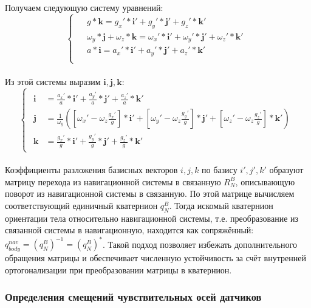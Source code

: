 Получаем следующую систему уравнений:
\[
\begin{cases}
	\begin{aligned}
		&g * \bm{k} = g_{x}' * \bm{i}' + g_{y}' * \bm{j}' + g_{z}' * \bm{k}' \\
		&\omega_{y} * \bm{j} + \omega_{z} * \bm{k} = \omega_{x}' * \bm{i}' + \omega_{y}' * \bm{j}' + \omega_{z}' * \bm{k}' \\
		&a * \bm{i} = a_{x}' * \bm{i}' + a_{y}' * \bm{j}' + a_{z}' * \bm{k}' \\
	\end{aligned}
\end{cases}
\] \\


Из этой системы выразим $\bm{i}, \bm{j}, \bm{k}$:
\[
\begin{cases}
	\begin{aligned}
	\bm{i} &= \frac{a_{x}'}{a} * \bm{i}' + \frac{a_{y}'}{a} * \bm{j}' + \frac{a_{z}'}{a} * \bm{k}' \\
	\bm{j} &= \frac{1}{\omega_{y}} 
		\left( 
			\left[ \omega_{x}' - \omega_{z} \frac{g_{x}'}{g} \right] * \bm{i}' + 
			\left[ \omega_{y}' - \omega_{z} \frac{g_{y}'}{g} \right] * \bm{j}' + 
			\left[ \omega_{z}' - \omega_{z} \frac{g_{z}'}{g} \right] * \bm{k}'
		\right) \\
	\bm{k} &= \frac{g_{x}'}{g} * \bm{i}' + \frac{g_{y}'}{g} * \bm{j}' + \frac{g_{z}'}{g} * \bm{k}'
	\end{aligned}
\end{cases}
\] \\


Коэффициенты разложения базисных векторов $i, j, k$ по базису $i', j', k'$ образуют матрицу перехода из навигационной системы в связанную $R_N^B$, описывающую поворот из навигационной системы в связанную. По этой матрице вычисляем соответствующий единичный кватернион $q_N^B$. Тогда искомый кватернион ориентации тела относительно навигационной системы, т.е. преобразование из связанной системы в навигационную, находится как сопряжённый: $q_{body}^{nav} = \left( q_N^B \right)^{-1} = \left( q_N^B \right)^{*}$. Такой подход позволяет избежать дополнительного обращения матрицы и обеспечивает численную устойчивость за счёт внутренней ортогонализации при преобразовании матрицы в кватернион.


\subsubsection{Определения смещений чувствительных осей датчиков}

